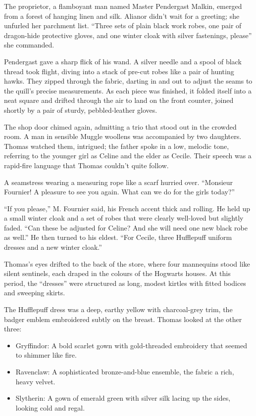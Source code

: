 The proprietor, a flamboyant man named Master Pendergast Malkin, emerged from a forest of hanging linen and silk. Alianor didn't wait for a greeting; she unfurled her parchment list. \enquote{Three sets of plain black work robes, one pair of dragon-hide protective gloves, and one winter cloak with silver fastenings, please} she commanded.

Pendergast gave a sharp flick of his wand. A silver needle and a spool of black thread took flight, diving into a stack of pre-cut robes like a pair of hunting hawks. They zipped through the fabric, darting in and out to adjust the seams to the quill's precise measurements. As each piece was finished, it folded itself into a neat square and drifted through the air to land on the front counter, joined shortly by a pair of sturdy, pebbled-leather gloves.

The shop door chimed again, admitting a trio that stood out in the crowded room. A man in sensible Muggle woollens was accompanied by two daughters. Thomas watched them, intrigued; the father spoke in a low, melodic tone, referring to the younger girl as Celine and the elder as Cecile. Their speech was a rapid-fire language that Thomas couldn't quite follow.

A seamstress wearing a measuring rope like a scarf hurried over. \enquote{Monsieur Fournier! A pleasure to see you again. What can we do for the girls today?}

\enquote{If you please,} M. Fournier said, his French accent thick and rolling. He held up a small winter cloak and a set of robes that were clearly well-loved but slightly faded. \enquote{Can these be adjusted for Celine? And she will need one new black robe as well.} He then turned to his eldest. \enquote{For Cecile, three Hufflepuff uniform dresses and a new winter cloak.}

Thomas's eyes drifted to the back of the store, where four mannequins stood like silent sentinels, each draped in the colours of the Hogwarts houses. At this period, the \enquote{dresses} were structured as long, modest kirtles with fitted bodices and sweeping skirts.

The Hufflepuff dress was a deep, earthy yellow with charcoal-grey trim, the badger emblem embroidered subtly on the breast. Thomas looked at the other three:

\begin{itemize}
    \item Gryffindor: A bold scarlet gown with gold-threaded embroidery that seemed to shimmer like fire.

    \item Ravenclaw: A sophisticated bronze-and-blue ensemble, the fabric a rich, heavy velvet.

    \item Slytherin: A gown of emerald green with silver silk lacing up the sides, looking cold and regal.
\end{itemize}

